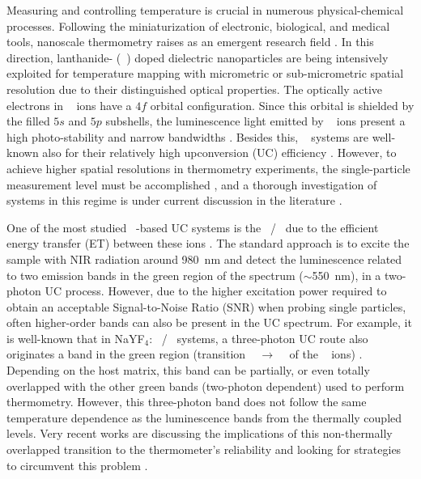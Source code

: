 \documentclass[journal=jacsat,manuscript=article, layout=twocolumn]{achemso}
\newcommand*\Yb[1]{Yb$^{3+}$}
\newcommand*\Er[1]{Er$^{3+}$}
\newcommand*\Ln[1]{Ln$^{3+}$}
\newcommand*\twoHnine[1]{$^2$H$_{9/2}$}
\newcommand*\fourIthirteen[1]{$^4$I$_{13/2}$}
\begin{document}
Measuring and controlling temperature is crucial in numerous physical-chemical processes. Following the miniaturization of electronic, biological, and medical tools, nanoscale thermometry raises as an emergent research field \cite{Bradac_2020, Jaque_2022, Maturi_2021, Brites_2012}. In this direction, lanthanide- (\Ln~) doped dielectric nanoparticles are being intensively exploited for temperature mapping with micrometric or sub-micrometric spatial resolution \cite{Martinez_2022, vanSwieten_2021, Gong_2021, Pinol_2020, Savchuk_2019, Baral_2018, Aigouy_2005} due to their distinguished optical properties. The optically active electrons in \Ln~ ions have a $4f$ orbital configuration. Since this orbital is shielded by the filled $5s$ and $5p$ subshells, the luminescence light emitted by \Ln~ ions present a high photo-stability and narrow bandwidths \cite{Brik_2020}. Besides this, \Ln~ systems are well-known also for their relatively high upconversion (UC) efficiency \cite{Zhu_2019}. However, to achieve higher spatial resolutions in thermometry experiments, the single-particle measurement level must be accomplished \cite{Dong_2020}, and a thorough investigation of \Ln~ systems in this regime is under current discussion in the literature \cite{Pessoa_2022, Goncalves_2021, Galindo_2021, Galindo_2021_corr, Galvao_2021, Camargo_2017, Galvao_2021_2}.

One of the most studied \Ln~-based UC systems is the \Yb~/\Er~ due to the efficient energy transfer (ET) between these ions \cite{Menezes_2015}. The standard approach is to excite the sample with NIR radiation around \SI{980}{\nano\meter} and detect the luminescence related to two emission bands in the green region of the spectrum ($\sim$\SI{550}{\nano\meter}), in a two-photon UC process. However, due to the higher excitation power required to obtain an acceptable Signal-to-Noise Ratio (SNR) when probing single particles, often higher-order bands can also be present in the UC spectrum. For example, it is well-known that in NaYF$_4$: \Yb~/\Er~ systems, a three-photon UC route also originates a band in the green region (transition \twoHnine~ $\rightarrow$ \fourIthirteen~ of the \Er~ ions) \cite{Ruhl_2021}. Depending on the host matrix, this band can be partially, or even totally overlapped with the other green bands (two-photon dependent) used to perform thermometry. However, this three-photon band does not follow the same temperature dependence as the luminescence bands from the thermally coupled levels. Very recent works are discussing the implications of this non-thermally overlapped transition to the thermometer's reliability and looking for strategies to circumvent this problem \cite{Martinez_2022, Ruhl_2021, Martins_2021, vanSwieten_2021, Labrador_2018}.
\end{document}
